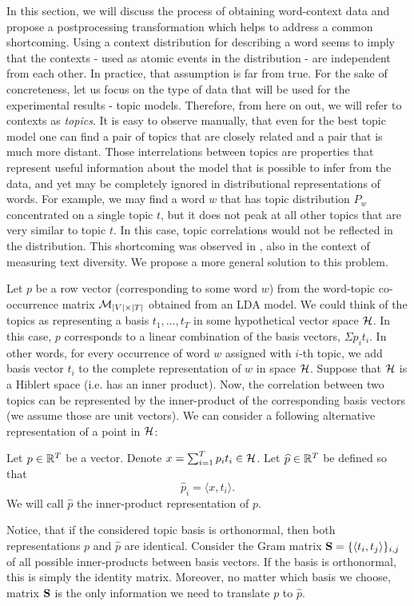 In this section, we will discuss the process of obtaining word-context
data and propose a postprocessing transformation which helps to
address a common shortcoming. Using a context distribution for
describing a word seems to imply that the
contexts - used as atomic events in the distribution - are independent
from each other. In practice, that assumption is far from true. For
the sake of concreteness, let us focus on the type of data that will be used for
the experimental results - topic models. Therefore, from here on out, we will
refer to contexts as {\em topics}. It is easy to observe
manually, that even for the best topic model one can find a pair of
topics that are closely related and a pair that is much more
distant. Those interrelations between topics are 
properties that represent useful information about the model that is
possible to infer from the data, and yet
may be completely ignored in distributional representations of words. 
For example, we may find a word $w$ that has topic distribution $P_w$
concentrated on a single topic $t$, but it does 
not peak at all other topics that are very similar to
topic $t$. In this case, topic correlations would not be reflected in
the distribution. This shortcoming was observed in \cite{bache:2013},
also in the context of measuring text diversity. We propose a more
general solution to this problem.

Let $p$ be a row vector (corresponding to some word $w$)  from the
word-topic co-occurrence matrix ${\mathcal M}_{|V|\times|T|}$ obtained from an LDA
model. We could think of the topics as representing a basis
$t_1,...,t_T$ in some hypothetical vector space ${\mathcal H}$. In 
this case, $p$ corresponds to a linear combination of the basis
vectors, $\Sigma p_i t_i$. In other words, for every occurrence of
word $w$ assigned with $i$-th topic, we add basis vector $t_i$ to the
complete representation of $w$ in space ${\mathcal H}$.
Suppose that ${\mathcal H}$ is a Hiblert space (i.e. has an inner
product). Now, the correlation between two topics can be represented
by the inner-product of the corresponding basis vectors (we assume those
are unit vectors). We can consider a following alternative representation
of a point in ${\mathcal H}$:

\bed
Let $p\in{\mathbb R}^T$ be a vector. Denote $x=\sum_{i=1}^T p_i
t_i\in{\mathcal H}$. Let $\widehat{p}\in{\mathbb R}^T$ be defined so that
\[\widehat{p}_i = \langle x,t_i\rangle.\]
We will call $\widehat{p}$ the inner-product representation of $p$.
\eed

Notice, that if the considered topic basis is orthonormal, then both
representations $p$ and $\widehat{p}$ are identical. Consider the Gram matrix
$\operatorname{\mathbf{S}}=\{\langle t_i,t_j\rangle\}_{i,j}$ of all possible inner-products between
basis vectors. If the basis is orthonormal, this is simply the identity
matrix. Moreover, no matter which basis we choose, matrix $\operatorname{\mathbf{S}}$ is the
only information we need to translate $p$ to $\widehat{p}$.

